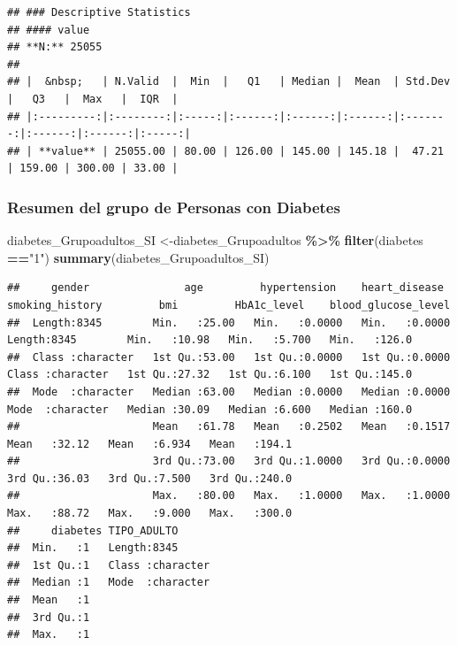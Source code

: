 \documentclass[
]{article}
\newenvironment{Shaded}{\begin{snugshade}}{\end{snugshade}}
\newcommand{\FunctionTok}[1]{\textcolor[rgb]{0.13,0.29,0.53}{\textbf{#1}}}
\newcommand{\NormalTok}[1]{#1}
\newcommand{\OtherTok}[1]{\textcolor[rgb]{0.56,0.35,0.01}{#1}}
\newcommand{\SpecialCharTok}[1]{\textcolor[rgb]{0.81,0.36,0.00}{\textbf{#1}}}
\newcommand{\StringTok}[1]{\textcolor[rgb]{0.31,0.60,0.02}{#1}}
\begin{document}
\begin{verbatim}
## ### Descriptive Statistics  
## #### value  
## **N:** 25055  
## 
## |  &nbsp;   | N.Valid  |  Min  |   Q1   | Median |  Mean  | Std.Dev |   Q3   |  Max   |  IQR  |
## |:---------:|:--------:|:-----:|:------:|:------:|:------:|:-------:|:------:|:------:|:-----:|
## | **value** | 25055.00 | 80.00 | 126.00 | 145.00 | 145.18 |  47.21  | 159.00 | 300.00 | 33.00 |
\end{verbatim}

\hypertarget{resumen-del-grupo-de-personas-con-diabetes}{%
\subsubsection{Resumen del grupo de Personas con
Diabetes}\label{resumen-del-grupo-de-personas-con-diabetes}}

\begin{Shaded}
\begin{Highlighting}[]
\NormalTok{diabetes\_Grupoadultos\_SI }\OtherTok{\textless{}{-}}\NormalTok{diabetes\_Grupoadultos }\SpecialCharTok{\%\textgreater{}\%} \FunctionTok{filter}\NormalTok{(diabetes }\SpecialCharTok{==}\StringTok{"1"}\NormalTok{) }
\FunctionTok{summary}\NormalTok{(diabetes\_Grupoadultos\_SI)}
\end{Highlighting}
\end{Shaded}

\begin{verbatim}
##     gender               age         hypertension    heart_disease    smoking_history         bmi         HbA1c_level    blood_glucose_level
##  Length:8345        Min.   :25.00   Min.   :0.0000   Min.   :0.0000   Length:8345        Min.   :10.98   Min.   :5.700   Min.   :126.0      
##  Class :character   1st Qu.:53.00   1st Qu.:0.0000   1st Qu.:0.0000   Class :character   1st Qu.:27.32   1st Qu.:6.100   1st Qu.:145.0      
##  Mode  :character   Median :63.00   Median :0.0000   Median :0.0000   Mode  :character   Median :30.09   Median :6.600   Median :160.0      
##                     Mean   :61.78   Mean   :0.2502   Mean   :0.1517                      Mean   :32.12   Mean   :6.934   Mean   :194.1      
##                     3rd Qu.:73.00   3rd Qu.:1.0000   3rd Qu.:0.0000                      3rd Qu.:36.03   3rd Qu.:7.500   3rd Qu.:240.0      
##                     Max.   :80.00   Max.   :1.0000   Max.   :1.0000                      Max.   :88.72   Max.   :9.000   Max.   :300.0      
##     diabetes TIPO_ADULTO       
##  Min.   :1   Length:8345       
##  1st Qu.:1   Class :character  
##  Median :1   Mode  :character  
##  Mean   :1                     
##  3rd Qu.:1                     
##  Max.   :1
\end{verbatim}
\end{document}

